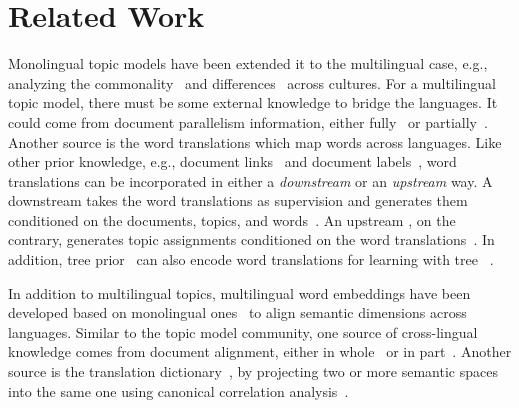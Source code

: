 \section{Related Work}
\label{sec:bg}


Monolingual topic models have been extended it to the multilingual case, e.g., analyzing the commonality~\cite{shi-2016-mtm-common} and differences~\cite{gutierrez-2016-mtm-diff} across cultures. 
%
For a multilingual topic model, there must be some external knowledge to bridge the languages. 
%
It could come from document parallelism information, either fully~\cite{mimno-2009-plda} or partially~\cite{hao-2018-mtm-doc-link}. 
%
Another source is the word translations which map words across languages. 
%
Like other prior knowledge, e.g., document links~\cite{daume-2009-mrtf,chang-2010-rtm,Yang:Boyd-Graber:Resnik-2016} and document labels~\cite{ramage-2009-labeled-lda,mcauliffe-2008-slda,zhu-2012-medlda}, word translations can be incorporated in either a \emph{downstream} or an \emph{upstream} way. 
%
A downstream \mtm takes the word translations as supervision and generates them conditioned on the documents, topics, and words~\cite{liu-2015-mtm-downstream}.   
%
An upstream \mtm, on the contrary, generates topic assignments conditioned on the word translations~\cite{boyd-graber-2009-muto,jagarlamudi-2010-mtm,boyd-graber-2010-mlslda}. 
%
In addition, tree prior~\cite{boyd-graber-2007-tm-wsd} can also encode
word translations for learning \mtms with tree
\lda~\cite{Hu-2014-ptlda}.

In addition to multilingual topics, multilingual word embeddings have been developed based on monolingual ones~\cite{mikolov-2013-word2vec,pennington-2014-glove} to align semantic dimensions across languages. 
%
Similar to the topic model community, one source of cross-lingual knowledge comes from document alignment, either in whole~\cite{sogaard-2015-mwe-inverted-indexing,hermann-2014-ted} or in part~\cite{vulic-2015-mwe-doc-align}. 
%
Another source is the translation
dictionary~\cite{faruqui-2014-mwe-cca,lu-2015-mwe-deep-cca,ammar-2016-uw-embed},
by projecting two or more semantic spaces into the same one using
canonical correlation analysis~\cite[\cca]{hardoon-2004-cca}.

